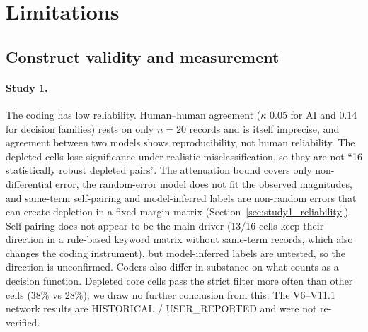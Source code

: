 \section{Limitations}
\label{sec:limitations}

\subsection{Construct validity and measurement}
\label{sec:lim_measurement}

\paragraph{Study 1.} The coding has low reliability. Human--human agreement ($\kappa$ 0.05 for AI and 0.14 for decision families) rests on only $n=20$ records and is itself imprecise, and agreement between two models shows reproducibility, not human reliability. The depleted cells lose significance under realistic misclassification, so they are not ``16 statistically robust depleted pairs''. The attenuation bound covers only non-differential error, the random-error model does not fit the observed magnitudes, and same-term self-pairing and model-inferred labels are non-random errors that can create depletion in a fixed-margin matrix (Section~\ref{sec:study1_reliability}). Self-pairing does not appear to be the main driver (13/16 cells keep their direction in a rule-based keyword matrix without same-term records, which also changes the coding instrument), but model-inferred labels are untested, so the direction is unconfirmed. Coders also differ in substance on what counts as a decision function. Depleted core cells pass the strict filter more often than other cells (38\% vs 28\%); we draw no further conclusion from this. The V6--V11.1 network results are HISTORICAL / USER\_REPORTED and were not re-verified.

